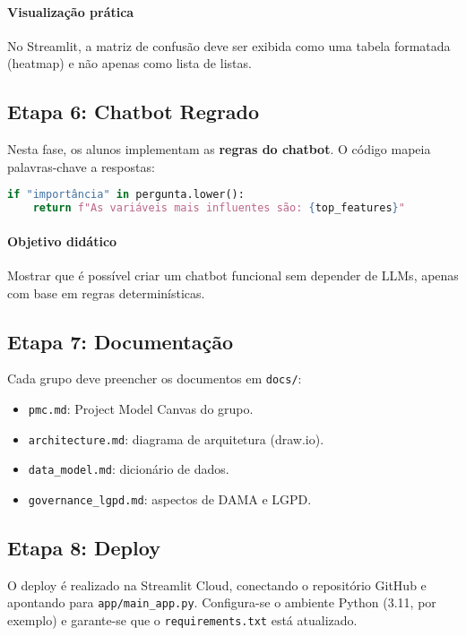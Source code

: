 \documentclass[12pt,a4paper]{article}
\begin{document}
\paragraph{Visualização prática}
No Streamlit, a matriz de confusão deve ser exibida como uma tabela formatada (heatmap) e não apenas como lista de listas.

\subsection{Etapa 6: Chatbot Regrado}

Nesta fase, os alunos implementam as \textbf{regras do chatbot}. O código mapeia palavras-chave a respostas:

\begin{lstlisting}[language=python]
if "importância" in pergunta.lower():
    return f"As variáveis mais influentes são: {top_features}"
\end{lstlisting}

\paragraph{Objetivo didático}  
Mostrar que é possível criar um chatbot funcional sem depender de LLMs, apenas com base em regras determinísticas.

\subsection{Etapa 7: Documentação}

Cada grupo deve preencher os documentos em \texttt{docs/}:
\begin{itemize}
  \item \texttt{pmc.md}: Project Model Canvas do grupo.
  \item \texttt{architecture.md}: diagrama de arquitetura (draw.io).
  \item \texttt{data\_model.md}: dicionário de dados.
  \item \texttt{governance\_lgpd.md}: aspectos de DAMA e LGPD.
\end{itemize}

\subsection{Etapa 8: Deploy}

O deploy é realizado na Streamlit Cloud, conectando o repositório GitHub e apontando para \texttt{app/main\_app.py}.  
Configura-se o ambiente Python (3.11, por exemplo) e garante-se que o \texttt{requirements.txt} está atualizado.
\end{document}
